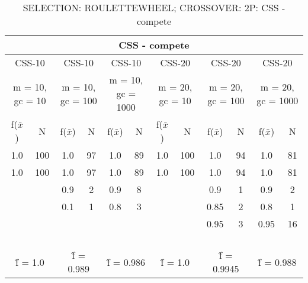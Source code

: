 \begin{table}[H]
	\centering
	\caption{SELECTION: ROULETTEWHEEL; CROSSOVER: 2P: CSS - compete}
	\begin{adjustbox}{width=1\textwidth}
		\begin{tabular}{ |c|c||c|c||c|c||c|c||c|c||c|c| }
			\hline
			\multicolumn{12}{|c|}{CSS - compete} \\
			\hline
			\multicolumn{2}{|c||}{CSS-10} & \multicolumn{2}{c||}{CSS-10} & \multicolumn{2}{c||}{CSS-10} & \multicolumn{2}{c||}{CSS-20} & \multicolumn{2}{c||}{CSS-20} & \multicolumn{2}{c|}{CSS-20}\\
			\hline
			\multicolumn{2}{|c||}{m = 10, gc = 10} & \multicolumn{2}{c||}{m = 10, gc = 100} & \multicolumn{2}{c||}{m = 10, gc = 1000} & \multicolumn{2}{c||}{m = 20, gc = 10} & \multicolumn{2}{c||}{m = 20, gc = 100} & \multicolumn{2}{c|}{m = 20, gc = 1000}\\
			\hline
			f($\bar{x}$) & N & f($\bar{x}$) & N & f($\bar{x}$) & N & f($\bar{x}$) & N & f($\bar{x}$) & N & f($\bar{x}$) & N\\
			\hline
			\hline
			1.0 & 100 & 1.0 & 97 & 1.0 & 89 & 1.0 & 100 & 1.0 & 94 & 1.0 & 81\\
			\hline
			1.0 & 100 & 1.0 & 97 & 1.0 & 89 & 1.0 & 100 & 1.0 & 94 & 1.0 & 81\\
			&   & 0.9 & 2 & 0.9 & 8 &   &   & 0.9 & 1 & 0.9 & 2\\
			&   & 0.1 & 1 & 0.8 & 3 &   &   & 0.85 & 2 & 0.8 & 1\\
			&   &   &   &   &   &   &   & 0.95 & 3 & 0.95 & 16\\
			&   &   &   &   &   &   &   &   &   &   &  \\
			&   &   &   &   &   &   &   &   &   &   &  \\
			&   &   &   &   &   &   &   &   &   &   &  \\
			&   &   &   &   &   &   &   &   &   &   &  \\
			\hline
			\multicolumn{2}{|c||}{\^{f} = 1.0} & \multicolumn{2}{c||}{\^{f} = 0.989} & \multicolumn{2}{c||}{\^{f} = 0.986} & \multicolumn{2}{c||}{\^{f} = 1.0} & \multicolumn{2}{c||}{\^{f} = 0.9945} & \multicolumn{2}{c|}{\^{f} = 0.988}\\
			\hline
		\end{tabular}
	\end{adjustbox}
\end{table}

